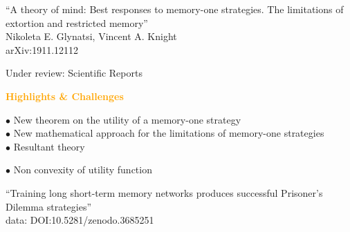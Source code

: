\documentclass{beamer}
\begin{document}
\begin{frame}
    \begin{center}
        \large{``A theory of mind: Best responses to memory-one strategies. The limitations of extortion and restricted memory''} \\ \vspace{.5cm}
        \footnotesize{Nikoleta E. Glynatsi, Vincent A. Knight} \\ \vspace{.5cm}
        \footnotesize{arXiv:1911.12112} \\ \vspace{.5cm}

        \footnotesize{Under review: Scientific Reports}
    \end{center}
\end{frame}

\begin{frame}
    \begin{center}
        
    \end{center}
\end{frame}

\begin{frame}
    \begin{center}
        \Large{\textbf{\textcolor{orange}{Highlights \& Challenges}}}
    \end{center}
    \vspace{.8cm} \pause

    \begin{minipage}{.5\textwidth}
        \(\bullet\) New theorem on the utility of a memory-one strategy  \vspace{.1cm} \\ \pause
        \(\bullet\) New mathematical approach for the limitations of memory-one strategies\vspace{.1cm} \\ \pause
        \(\bullet\) Resultant theory \vspace{.1cm} \\ \pause
    \end{minipage} \hfill
    \begin{minipage}{.45\textwidth}
        \(\bullet\) Non convexity of utility function \vspace{.1cm} \\
    \end{minipage}
\end{frame}

\begin{frame}
    \begin{center}
        \large{``Training long short-term memory networks produces successful Prisoner's Dilemma strategies''} \\ \vspace{.5cm}
        \footnotesize{data: DOI:10.5281/zenodo.3685251}
    \end{center}
\end{frame}
\end{document}
